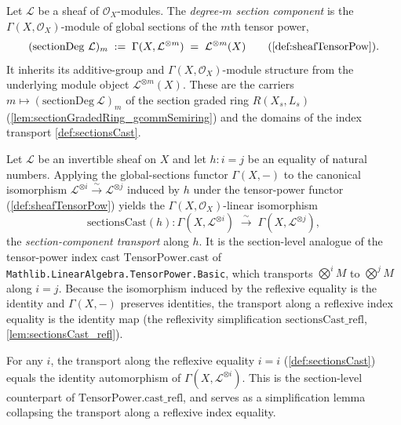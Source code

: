 \begin{definition}\leanok
  \label{def:sectionDeg}
  Let \(\mathcal{L}\) be a sheaf of \(\mathcal{O}_X\)-modules. The
  \emph{degree-\(m\) section component} is the \(\Gamma(X,\mathcal{O}_X)\)-module of
  global sections of the \(m\)th tensor power,
  \[
    (\mathrm{sectionDeg}\ \mathcal{L})_m
      \;:=\; \Gamma(X, \mathcal{L}^{\otimes m})
      \;=\; \mathcal{L}^{\otimes m}(X)
        \qquad(\cref{def:sheafTensorPow}).
  \]
  It inherits its additive-group and \(\Gamma(X,\mathcal{O}_X)\)-module structure
  from the underlying module object \(\mathcal{L}^{\otimes m}(X)\). These are the
  carriers \(m \mapsto (\mathrm{sectionDeg}\ \mathcal{L})_m\) of the section graded
  ring \(R(X_s, L_s)\) (\cref{lem:sectionGradedRing_gcommSemiring}) and the
  domains of the index transport \cref{def:sectionsCast}.
\end{definition}

\begin{definition}\leanok
  \label{def:sectionsCast}
  Let \(\mathcal{L}\) be an invertible sheaf on \(X\) and let \(h : i = j\) be an
  equality of natural numbers. Applying the global-sections functor
  \(\Gamma(X,-)\) to the canonical isomorphism
  \(\mathcal{L}^{\otimes i} \xrightarrow{\sim} \mathcal{L}^{\otimes j}\) induced by
  \(h\) under the tensor-power functor (\cref{def:sheafTensorPow}) yields the
  \(\Gamma(X,\mathcal{O}_X)\)-linear isomorphism
  \[
    \mathrm{sectionsCast}(h) :
    \Gamma(X, \mathcal{L}^{\otimes i}) \;\xrightarrow{\ \sim\ }\;
    \Gamma(X, \mathcal{L}^{\otimes j}),
  \]
  the \emph{section-component transport} along \(h\). It is the section-level
  analogue of the tensor-power index cast \(\mathrm{TensorPower.cast}\) of
  \texttt{Mathlib.LinearAlgebra.TensorPower.Basic}, which transports
  \(\bigotimes^{i} M\) to \(\bigotimes^{j} M\) along \(i = j\). Because the
  isomorphism induced by the reflexive equality is the identity and
  \(\Gamma(X,-)\) preserves identities, the transport along a reflexive index
  equality is the identity map (the reflexivity simplification
  \(\mathrm{sectionsCast\_refl}\), \cref{lem:sectionsCast_refl}).
\end{definition}

\begin{lemma}\leanok
  \label{lem:sectionsCast_refl}
  For any \(i\), the transport along the reflexive equality \(i = i\)
  (\cref{def:sectionsCast}) equals the identity automorphism of
  \(\Gamma(X, \mathcal{L}^{\otimes i})\). This is the section-level counterpart of
  \(\mathrm{TensorPower.cast\_refl}\), and serves as a simplification lemma
  collapsing the transport along a reflexive index equality.
\end{lemma}

